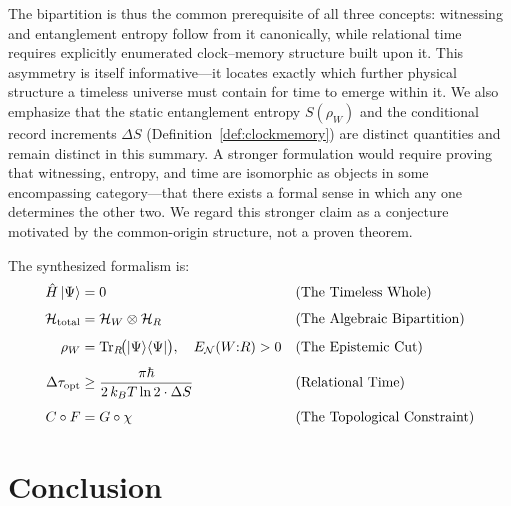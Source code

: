 \documentclass[11pt, a4paper]{article}
\begin{document}
The bipartition is thus the common prerequisite of all three concepts: witnessing and entanglement entropy follow from it canonically, while relational time requires explicitly enumerated clock--memory structure built upon it. This asymmetry is itself informative---it locates exactly which further physical structure a timeless universe must contain for time to emerge within it. We also emphasize that the static entanglement entropy $S(\rho_W)$ and the conditional record increments $\Delta S$ (Definition~\ref{def:clockmemory}) are distinct quantities and remain distinct in this summary. A stronger formulation would require proving that witnessing, entropy, and time are isomorphic as objects in some encompassing category---that there exists a formal sense in which any one determines the other two. We regard this stronger claim as a conjecture motivated by the common-origin structure, not a proven theorem.

The synthesized formalism is:
\begin{align}
\hat{H}\ket{\Psi} &= 0 &&\text{(The Timeless Whole)} \label{eq:syn1}\\[4pt]
\mathcal{H}_{\mathrm{total}} &= \mathcal{H}_W \otimes \mathcal{H}_R &&\text{(The Algebraic Bipartition)} \label{eq:syn2}\\[4pt]
\rho_W &= \operatorname{Tr}_R\!\bigl(\ket{\Psi}\!\bra{\Psi}\bigr), \quad E_{\mathcal{N}}(W{:}R) > 0 &&\text{(The Epistemic Cut)} \label{eq:syn3}\\[4pt]
\Delta\tau_{\mathrm{opt}} &\geq \frac{\pi\hbar}{2\, k_B T \ln 2 \cdot \Delta S} &&\text{(Relational Time)} \label{eq:syn4}\\[4pt]
C \circ F &= G \circ \chi &&\text{(The Topological Constraint)} \label{eq:syn5}
\end{align}

\section{Conclusion}
\label{sec:conclusion}
\end{document}
